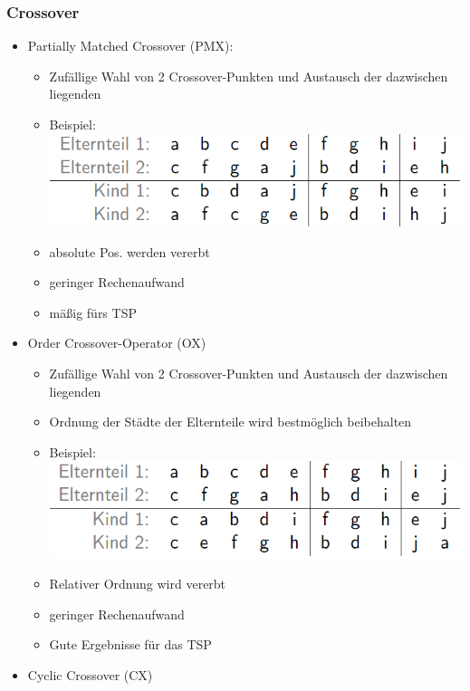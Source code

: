 \documentclass[12pt]{article}
\begin{document}
			\subsubsection{Crossover}
				\begin{itemize}
					\item Partially Matched Crossover (PMX):\\
						\begin{itemize}
							\item Zufällige Wahl von 2 Crossover-Punkten und Austausch der dazwischen liegenden
							\item[] Beispiel:\\
								\includegraphics[scale=0.6]{PMXExample}
							\item absolute Pos. werden vererbt
							\item geringer Rechenaufwand
							\item mäßig fürs TSP
						\end{itemize}
					\item Order Crossover-Operator (OX)
						\begin{itemize}
							\item Zufällige Wahl von 2 Crossover-Punkten und Austausch der dazwischen liegenden
							\item Ordnung der Städte der Elternteile wird bestmöglich beibehalten
							\item[] Beispiel:\\
								\includegraphics[scale=0.6]{OXExample}
							\item Relativer Ordnung wird vererbt
							\item geringer Rechenaufwand
							\item Gute Ergebnisse für das TSP
						\end{itemize}	
					\item Cyclic Crossover (CX)

\end{itemize}
\end{document}
